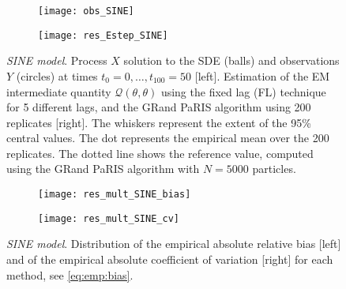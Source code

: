 \documentclass[12pt]{article}
\newcommand{\eqsp}{\;}
\newcommand{\1}{\mathrm{1}}
\begin{document}
\begin{figure}[p]
\centering
\begin{subfigure}{0.49\textwidth}
\texttt{[image: obs\_SINE]}
\end{subfigure}
\begin{subfigure}{0.49\textwidth}
\texttt{[image: res\_Estep\_SINE]}
\end{subfigure}
\caption{{\em SINE model}. Process $X$ solution to the SDE (balls) and observations $Y$ (circles) at times $t_0=0,\dots,t_{100}=50$ [left]. Estimation of the EM intermediate quantity $\mathcal{Q}(\theta,\theta)$  using the fixed lag (FL) technique for 5 different lags, and the GRand PaRIS algorithm using 200 replicates [right]. The whiskers represent the extent of the 95\% central values. The dot represents the empirical mean over the 200 replicates. The dotted line shows the reference value, computed using the GRand PaRIS algorithm with $N=5000$ particles.}
\label{fig:res:SINE}
\end{figure}
\begin{figure}[p]
\centering
\begin{subfigure}{0.49\textwidth}
\texttt{[image: res\_mult\_SINE\_bias]}
\end{subfigure}
\begin{subfigure}{0.49\textwidth}
\texttt{[image: res\_mult\_SINE\_cv]}
\end{subfigure}
\caption{{\em SINE model}. Distribution of the empirical absolute relative bias [left] and of the empirical absolute coefficient of variation [right] for each method, see \eqref{eq:emp:bias}.}
\label{fig:mult:SINE}
\end{figure}

\end{document}
